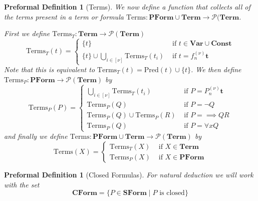 \documentclass[oneside, 12pt]{book}
\theoremstyle{break}
\newtheorem{preformal definition}[definition]{Preformal Definition}
\newtheorem{preformal theorem}[theorem]{Preformal Theorem}
\newcommand{\bv}[1]{\boldsymbol{#1}}
\newcommand{\mc}[1]{\mathcal{#1}}
\begin{document}
		\begin{preformal definition}[Terms]
			We now define a function that collects all of the terms present in a term or formula $\text{Terms}: \textbf{PForm} \cup \textbf{Term} \to \mc{P}(\textbf{Term}$.
			
			First we define $\text{Terms}_T: \textbf{Term} \to \mc{P}(\textbf{Term})$
			\begin{equation*}
				\text{Terms}_T(t) = \begin{cases}
					\{t\} &\text{ if } t \in \textbf{Var}\cup \textbf{Const}\\
					\{t\} \cup \bigcup_{i\in [\nu]} \text{Terms}_T(t_i) &\text{ if } t = f_n^{(\nu)}\bv{t}
				\end{cases}
			\end{equation*}
			Note that this is equivalent to $\text{Terms}_T(t) = \text{Pred}(t) \cup \{t\}$.
			We then define $\text{Terms}_P:\textbf{PForm} \to \mc{P}(\textbf{Term})$ by
			\begin{equation*}
				\text{Terms}_P(P) = \begin{cases}
					\bigcup_{i\in [\nu]} \text{Terms}_T(t_i)&\text{ if } P = P_n^{(\nu)}\bv{t}\\
					\text{Terms}_P(Q) &\text{ if } P = \lnot Q\\
					\text{Terms}_P(Q) \cup \text{Terms}_P(R) &\text{ if } P = \implies QR\\
					\text{Terms}_P(Q) &\text{ if } P = \forall x Q
				\end{cases}
			\end{equation*}
			and finally we define $\text{Terms}: \textbf{PForm} \cup \textbf{Term} \to \mc{P}(\textbf{Term})$ by
			\begin{equation*}
				\text{Terms}(X) = \begin{cases}
					\text{Terms}_T(X) &\text{ if } X \in \textbf{Term}\\
					\text{Terms}_P(X) &\text{ if } X \in \textbf{PForm}
				\end{cases}
			\end{equation*}
		\end{preformal definition}
		
		\begin{preformal definition}[Closed Formulas]
			For natural deduction we will work with the set
			\begin{equation*}
				\textbf{CForm} = \{P \in \textbf{SForm} \mid P \text{ is closed}\}
			\end{equation*}
		\end{preformal definition}
	
\end{document}
